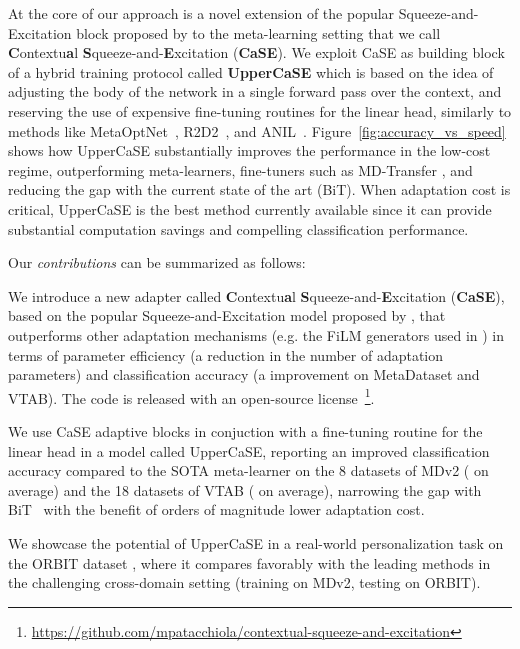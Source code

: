 \documentclass{article}
\begin{document}
At the core of our approach is a novel extension of the popular Squeeze-and-Excitation block proposed by \cite{hu2018squeeze} to the meta-learning setting that we call \textbf{C}ontextu\textbf{a}l \textbf{S}queeze-and-\textbf{E}xcitation (\textbf{CaSE}). We exploit CaSE as building block of a hybrid training protocol called \textbf{UpperCaSE} which is based on the idea of adjusting the body of the network in a single forward pass over the context, and reserving the use of expensive fine-tuning routines for the linear head, similarly to methods like MetaOptNet~\citep{lee2019meta}, R2D2~\citep{bertinetto2018meta}, and ANIL~\citep{raghu2019rapid}. Figure~\ref{fig:accuracy_vs_speed} shows how UpperCaSE substantially improves the performance in the low-cost regime, outperforming meta-learners, fine-tuners such as MD-Transfer \citep{triantafillou2019meta}, and reducing the gap with the current state of the art (BiT). When adaptation cost is critical, UpperCaSE is the best method currently available since it can provide substantial computation savings and compelling classification performance. 

Our \emph{contributions} can be summarized as follows:

\begin{compactenum}
\item We introduce a new adapter called \textbf{C}ontextu\textbf{a}l \textbf{S}queeze-and-\textbf{E}xcitation (\textbf{CaSE}), based on the popular Squeeze-and-Excitation model proposed by \cite{hu2018squeeze}, that outperforms other adaptation mechanisms (e.g. the FiLM generators used in \citealt{bronskill2021memory}) in terms of parameter efficiency (a  reduction in the number of adaptation parameters) and classification accuracy (a  improvement on MetaDataset and VTAB). The code is released with an open-source license~\footnote[1]{\url{https://github.com/mpatacchiola/contextual-squeeze-and-excitation}}.
    \item We use CaSE adaptive blocks in conjuction with a fine-tuning routine for the linear head in a model called UpperCaSE, reporting an improved classification accuracy compared to the SOTA meta-learner \citep{bronskill2021memory} on the 8 datasets of MDv2 ( on average) and the 18 datasets of VTAB ( on average), narrowing the gap with BiT~\citep{kolesnikov2020big} with the benefit of orders of magnitude lower adaptation cost.
    \item We showcase the potential of UpperCaSE 
    in a real-world personalization task on the ORBIT dataset \citep{massiceti2021orbit}, where it compares favorably with the leading methods in the challenging cross-domain setting (training on MDv2, testing on ORBIT).
\end{compactenum}
\end{document}
